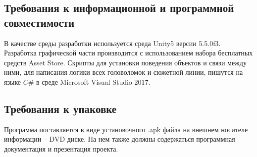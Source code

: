 \subsection{Требования к информационной и программной совместимости}
В качестве среды разработки используется среда Unity5 версии 5.5.0f3.
Разработка графической части производится с использованием набора бесплатных средств Asset Store.
Скрипты для установки поведения объектов и связи между ними, для написания логики всех головоломок и сюжетной линии, пишутся на языке $C\#$ в среде Microsoft Visual Studio 2017. 


\subsection{Требования к упаковке}
Программа поставляется в виде установочного .apk файла на внешнем носителе информации – DVD диске. На нем также должны содержаться программная документация и презентация проекта.
